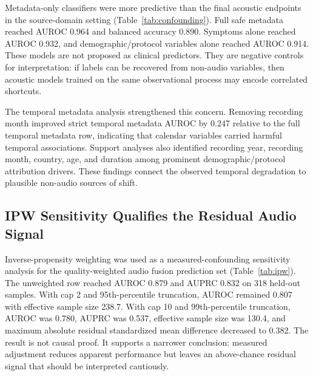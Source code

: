 \documentclass[preprint,12pt]{elsarticle}
\begin{document}
Metadata-only classifiers were more predictive than the final acoustic endpoints in the source-domain setting (Table~\ref{tab:confounding}). Full safe metadata reached AUROC 0.964 and balanced accuracy 0.890. Symptoms alone reached AUROC 0.932, and demographic/protocol variables alone reached AUROC 0.914. These models are not proposed as clinical predictors. They are negative controls for interpretation: if labels can be recovered from non-audio variables, then acoustic models trained on the same observational process may encode correlated shortcuts.

The temporal metadata analysis strengthened this concern. Removing recording month improved strict temporal metadata AUROC by 0.247 relative to the full temporal metadata row, indicating that calendar variables carried harmful temporal associations. Support analyses also identified recording year, recording month, country, age, and duration among prominent demographic/protocol attribution drivers. These findings connect the observed temporal degradation to plausible non-audio sources of shift.

\subsection{IPW Sensitivity Qualifies the Residual Audio Signal}

Inverse-propensity weighting was used as a measured-confounding sensitivity analysis for the quality-weighted audio fusion prediction set (Table~\ref{tab:ipw}). The unweighted row reached AUROC 0.879 and AUPRC 0.832 on 318 held-out samples. With cap 2 and 95th-percentile truncation, AUROC remained 0.807 with effective sample size 238.7. With cap 10 and 99th-percentile truncation, AUROC was 0.780, AUPRC was 0.537, effective sample size was 130.4, and maximum absolute residual standardized mean difference decreased to 0.382. The result is not causal proof. It supports a narrower conclusion: measured adjustment reduces apparent performance but leaves an above-chance residual signal that should be interpreted cautiously.

\begin{table}[t]
\centering
\caption{Inverse-propensity weighting sensitivity analysis for quality-weighted audio fusion. ESS denotes effective sample size; SMD denotes standardized mean difference.}
\label{tab:ipw}
\end{table}
\end{document}
